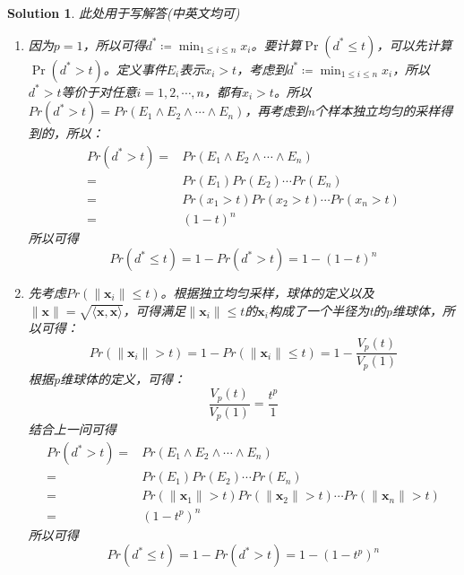 \documentclass[a4paper,UTF8]{article}
\numberwithin{equation}{section}
\newtheorem*{mySol}{Solution}
\begin{document}
\begin{mySol}
	此处用于写解答(中英文均可)
\begin{enumerate}[(1)]
\item 因为$p=1$，所以可得$d^* \coloneqq \min_{1\leq i \leq n} x_i$。要计算$\Pr(d^*\leq t)$，可以先计算$\Pr(d^* > t)$。定义事件$E_i$表示$x_i > t$，考虑到$d^* \coloneqq \min_{1\leq i \leq n} x_i$，所以$d^* > t$等价于对任意$i=1,2,\cdots,n$，都有$x_i > t$。所以$Pr(d^* > t) = Pr(E_1 \land E_2 \land \cdots \land E_n)$，再考虑到n个样本独立均匀的采样得到的，所以：
\begin{equation}
\begin{aligned}
Pr(d^* > t) =& Pr(E_1 \land E_2 \land \cdots \land E_n)\\
=& Pr(E_1)Pr(E_2)\cdots Pr(E_n)\\
=& Pr(x_1>t)Pr(x_2>t)\cdots Pr(x_n>t)\\
=& (1-t)^n
\end{aligned}
\end{equation}
所以可得
\begin{equation}
Pr(d^* \leq t) = 1 - Pr(d^* > t) = 1 - (1-t)^n
\end{equation}
\item 先考虑$Pr(\lVert \mathbf{x}_i \rVert \leq t)$。根据独立均匀采样，球体的定义以及$\lVert \mathbf{x} \rVert= \sqrt{\langle\mathbf{x}, \mathbf{x}\rangle}$，可得满足$\lVert \mathbf{x}_i \rVert \leq t$的$\mathbf{x}_i$构成了一个半径为t的p维球体，所以可得：
\begin{equation}
Pr(\lVert \mathbf{x}_i \rVert > t) = 1 - Pr(\lVert \mathbf{x}_i \rVert \leq t) = 1 - \frac{V_p(t)}{V_p(1)}
\end{equation}
根据p维球体的定义，可得：
\begin{equation}
\frac{V_p(t)}{V_p(1)} = \frac{t^p}{1}
\end{equation}
结合上一问可得
\begin{equation}
\begin{aligned}
Pr(d^* > t) =& Pr(E_1 \land E_2 \land \cdots \land E_n)\\
=& Pr(E_1)Pr(E_2)\cdots Pr(E_n)\\
=& Pr(\lVert \mathbf{x}_1\rVert > t)Pr(\lVert \mathbf{x}_2\rVert > t)\cdots Pr(\lVert \mathbf{x}_n\rVert > t)\\
=& (1 - t^p)^n
\end{aligned}
\end{equation}
所以可得
\begin{equation}
Pr(d^* \leq t) = 1 - Pr(d^* > t) = 1 - (1-t^p)^n
\end{equation}

\end{enumerate}
\end{mySol}
\end{document}
